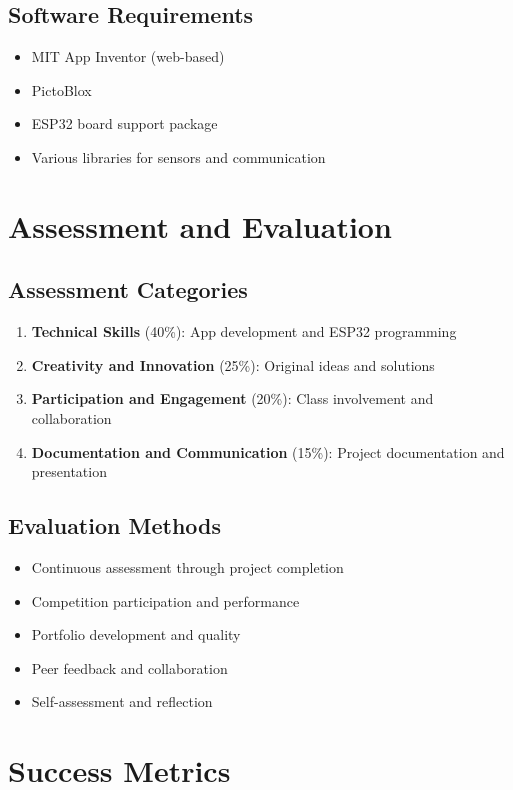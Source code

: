 \documentclass[12pt,a4paper]{article}
\begin{document}
\subsection{Software Requirements}
\begin{itemize}
    \item MIT App Inventor (web-based)
    \item PictoBlox
    \item ESP32 board support package
    \item Various libraries for sensors and communication
\end{itemize}

\section{Assessment and Evaluation}

\subsection{Assessment Categories}
\begin{enumerate}
    \item \textbf{Technical Skills} (40\%): App development and ESP32 programming
    \item \textbf{Creativity and Innovation} (25\%): Original ideas and solutions
    \item \textbf{Participation and Engagement} (20\%): Class involvement and collaboration
    \item \textbf{Documentation and Communication} (15\%): Project documentation and presentation
\end{enumerate}

\subsection{Evaluation Methods}
\begin{itemize}
    \item Continuous assessment through project completion
    \item Competition participation and performance
    \item Portfolio development and quality
    \item Peer feedback and collaboration
    \item Self-assessment and reflection
\end{itemize}

\section{Success Metrics}
\end{document}

